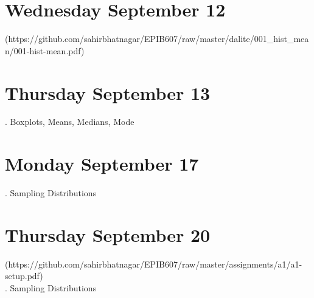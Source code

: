 \documentclass[]{book}
\let\originaltabular\tabular
\let\endoriginaltabular\endtabular
\renewenvironment{tabular}[1]{%
  \begingroup%
  \centering%
  \originaltabular{#1}}%
  {\endoriginaltabular\endgroup}
\theoremstyle{definition}
\theoremstyle{definition}
\theoremstyle{definition}
\theoremstyle{remark}
\begin{document}
\section{Wednesday September 12}\label{wednesday-september-12}

\begin{table}[H]
\centering
\begin{tabular}{l}
(https://github.com/sahirbhatnagar/EPIB607/raw/master/dalite/001\_hist\_mean/001-hist-mean.pdf)\\
\hline
\end{tabular}
\end{table}

\section{Thursday September 13}\label{thursday-september-13}

\begin{table}[H]
\centering
\begin{tabular}{l}
. Boxplots, Means, Medians, Mode\\
\hline
\end{tabular}
\end{table}

\section{Monday September 17}\label{monday-september-17}

\begin{table}[H]
\centering
\begin{tabular}{l}
. Sampling Distributions\\
\hline
\end{tabular}
\end{table}

\section{Thursday September 20}\label{thursday-september-20}

\begin{table}[H]
\centering
\begin{tabular}{l}
(https://github.com/sahirbhatnagar/EPIB607/raw/master/assignments/a1/a1-setup.pdf)\\
. Sampling Distributions\\
\hline
\end{tabular}
\end{table}
\end{document}
